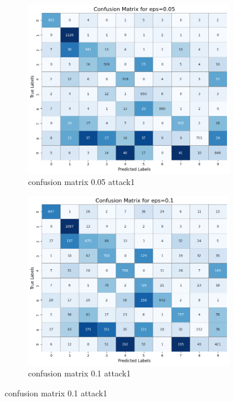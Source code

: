 \documentclass[11pt,onside]{article}
\begin{document}
\begin{figure}[h]
  \centering
  \begin{subfigure}[b]{0.49\textwidth}
    \centering
    \includegraphics[width=\textwidth]{V2_images/confusion_matrix_eps_0.05_attack_1.png}
    \caption{confusion matrix 0.05 attack1}
    \label{fig:image1}
  \end{subfigure}
  \hfill
  \begin{subfigure}[b]{0.49\textwidth}
    \centering
    \includegraphics[width=\textwidth]{V2_images/confusion_matrix_eps_0.1_attack_1.png}
    \caption{confusion matrix 0.1 attack1}
    \label{fig:image2}
  \end{subfigure}
  \label{fig:images}
\end{figure}
\end{document}
